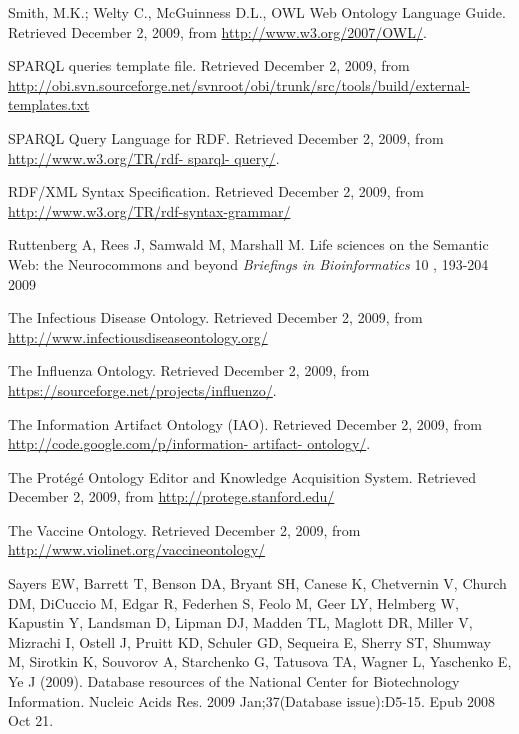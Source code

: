 \documentclass[jou]{ao2e}%
\begin{document}
\begin{thebibliography}{}
  Smith, M.K.; Welty C., McGuinness D.L., OWL Web Ontology Language Guide. Retrieved December 2, 2009, from \url{http://www.w3.org/2007/OWL/}.
 
   SPARQL queries template file. Retrieved December 2, 2009, from \url{http://obi.svn.sourceforge.net/svnroot/obi/trunk/src/tools/build/external-templates.txt}
  
  SPARQL Query Language for RDF. Retrieved December 2, 2009, from \url{http://www.w3.org/TR/rdf- sparql- query/}. 
 
  RDF/XML Syntax Specification. Retrieved December 2, 2009, from \url{http://www.w3.org/TR/rdf-syntax-grammar/}
 
  Ruttenberg A, Rees J, Samwald M, Marshall M. Life sciences on the Semantic Web: the Neurocommons and beyond \textit{Briefings in Bioinformatics} 10 , 193-204 2009
 
  The Infectious Disease Ontology. Retrieved December 2, 2009, from \url{http://www.infectiousdiseaseontology.org/}
 
  The Influenza Ontology. Retrieved December 2, 2009, from \url{https://sourceforge.net/projects/influenzo/}.
 
  The Information Artifact Ontology (IAO). Retrieved December 2, 2009, from \url{http://code.google.com/p/information- artifact- ontology/}.
 
  The Prot\'{e}g\'{e} Ontology Editor and Knowledge Acquisition System. Retrieved December 2, 2009, from \url{http://protege.stanford.edu/}
 
  The Vaccine Ontology. Retrieved December 2, 2009, from \url{http://www.violinet.org/vaccineontology/}

 Sayers EW, Barrett T, Benson DA, Bryant SH, Canese K, Chetvernin V,
   Church DM, DiCuccio M, Edgar R, Federhen S, Feolo M, Geer LY,
   Helmberg W, Kapustin Y, Landsman D, Lipman DJ, Madden TL, Maglott DR,
   Miller V, Mizrachi I, Ostell J, Pruitt KD, Schuler GD, Sequeira E,
   Sherry ST, Shumway M, Sirotkin K, Souvorov A, Starchenko G,
   Tatusova TA, Wagner L, Yaschenko E, Ye J (2009). Database resources
   of the National Center for Biotechnology Information. Nucleic Acids
   Res. 2009 Jan;37(Database issue):D5-15. Epub 2008 Oct 21.



\end{thebibliography}
\end{document}
